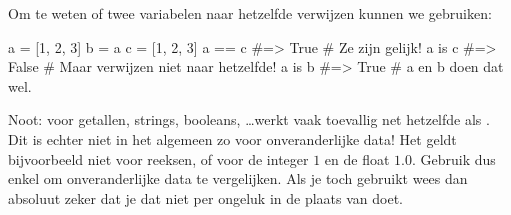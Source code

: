   Om te weten of twee variabelen naar hetzelfde verwijzen kunnen we 
  gebruiken:
  \begin{python}
    a = [1, 2, 3]
    b = a
    c = [1, 2, 3]
    a == c    #=> True  # Ze zijn gelijk!
    a is c    #=> False # Maar verwijzen niet naar hetzelfde!
    a is b    #=> True  # a en b doen dat wel.
  \end{python}
  Noot: voor getallen, strings, booleans, \ldots werkt  vaak toevallig
  net hetzelfde als \py{==}. Dit is echter niet in het algemeen zo voor
  onveranderlijke data! Het geldt bijvoorbeeld niet voor reeksen, of
  voor de integer $1$ en de float $1.0$. Gebruik dus enkel \py{==} om
  onveranderlijke data te vergelijken. Als je toch  gebruikt wees dan
  absoluut zeker dat je dat niet per ongeluk in de plaats van \py{==} doet.
